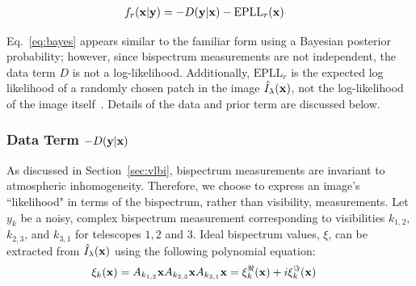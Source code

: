 {\vspace{-.2in}
\begin{align} 
f_r({\bf x} | {\bf y} )
&=  - D ({\bf y}|{\bf x}) - \mbox{EPLL}_r({\bf x})
\label{eq:bayes}
\end{align}
 \vspace{-.2in}


Eq.~\ref{eq:bayes} appears similar to the familiar form using a Bayesian posterior probability; however, since bispectrum measurements are not independent, the data term $D$ is not a log-likelihood. Additionally, $\mbox{EPLL}_r$ is the expected log likelihood of a randomly chosen patch in the image $\hat{I}_{\lambda}({\bf x})$, not the log-likelihood of the image itself~\cite{zoran2011learning}. 
Details of the data and prior term are discussed below. 



\vspace{-.15in}
\subsubsection{Data Term $- D ({\bf y}|{\bf x})$ }


As discussed in Section~\ref{sec:vlbi}, bispectrum measurements are invariant to atmospheric inhomogeneity. 
Therefore, we choose to express an image's ``likelihood" in terms of the bispectrum, rather than visibility, measurements. Let $y_k$ be a noisy, complex bispectrum measurement corresponding to visibilities $k_{1,2}$, $k_{2,3}$, and $k_{3,1}$ for telescopes $1,2$ and $3$. 
Ideal bispectrum values, $\xi$, can be extracted from $\hat{I}_{\lambda}({\bf x})$ using the following polynomial equation:
{\small 
	\begin{align}
	&\xi_k({\bf x}) =  A_{k_{1,2}} {\bf x}  A_{k_{2,3}}{\bf x}  A_{k_{3,1}}{\bf x}  = \xi_k^\Re({\bf x}) + i \xi_k^\Im({\bf x}) 
	\end{align}
}

}

